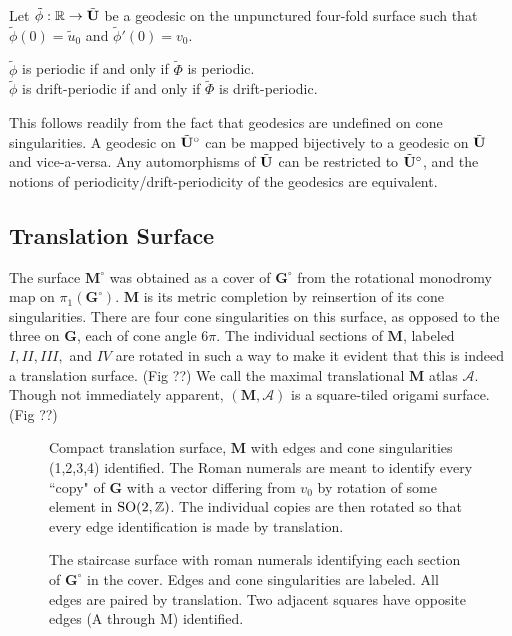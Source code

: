 \documentclass[a4paper, 11pt]{article}
\def\cA{\mathcal{A}}\def\cB{\mathcal{B}}\def\cC{\mathcal{C}}\def\cD{\mathcal{D}}\def\cE{\mathcal{E}}\def\cF{\mathcal{F}}\def\cG{\mathcal{G}}\def\cH{\mathcal{H}}\def\cI{\mathcal{I}}\def\cJ{\mathcal{J}}\def\cK{\mathcal{K}}\def\cL{\mathcal{L}}\def\cM{\mathcal{M}}\def\cN{\mathcal{N}}\def\cO{\mathcal{O}}\def\cP{\mathcal{P}}\def\cQ{\mathcal{Q}}\def\cR{\mathcal{R}}\def\cS{\mathcal{S}}\def\cT{\mathcal{T}}\def\cU{\mathcal{U}}\def\cV{\mathcal{V}}\def\cW{\mathcal{W}}\def\cX{\mathcal{X}}\def\cY{\mathcal{Y}}\def\cZ{\mathcal{Z}}
\def\bG{\mathbf{G}} \def\bGs{\mathbf{G}^\circ}
\def\bM{\mathbf{M}}
\def\bMs{\mathbf{M}^\circ}
\def\btUs{\btU^\circ}
\def\utild{\tilde{u}_0}
\def\phitild{\tilde{\Phi}}
\def\tildphi{\tilde{\phi}}
\def\SO{\mathrm{SO}}
\begin{document}
\begin{Def}
Let $\tildphi:\RR\rightarrow\btU$ be a geodesic on the unpunctured four-fold surface such that $\tildphi(0)=\utild$ and $\tildphi'(0)=v_0$.
\end{Def}

\begin{thm}
$\tildphi$ is periodic if and only if $\phitild$ is periodic.\\
$\tildphi$ is drift-periodic if and only if $\phitild$ is drift-periodic.
\end{thm}

This follows readily from the fact that geodesics are undefined on cone singularities. A geodesic on $\btUs$ can be mapped bijectively to a geodesic on  $\tilde{\mathbf{U}}$ and vice-a-versa. Any automorphisms of $\tilde{\mathbf{U}}$ can be restricted to $\btUs$, and the notions of periodicity/drift-periodicity of the geodesics are equivalent.



\subsection{Translation Surface}
The surface $\bMs$ was obtained as a cover of $\bGs$ from the rotational monodromy map on $\pi_1(\bGs)$. $\bM$ is its metric completion by reinsertion of its cone singularities. There are four cone singularities on this surface, as opposed to the three on $\bG$, each of cone angle $6\pi$. The individual sections of $\bM$, labeled $I,II,III,$ and $IV$ are rotated in such a way to make it evident that this is indeed a translation surface. (Fig ??) We call the maximal translational $\bM$ atlas $\cA$. Though not immediately apparent, $(\bM,\cA)$ is a square-tiled origami surface. (Fig ??)

\begin{figure}[H]
\centering

\caption{Compact translation surface, $\mathbf{M}$ with edges and cone singularities (1,2,3,4) identified. The Roman numerals are meant to identify every ``copy" of $\bG$ with a vector differing from $v_0$ by rotation of some element in $\SO(2,\ZZ)$. The individual copies are then rotated so that every edge identification is made by translation.}
\label{fig:mtilda}
\end{figure}

\begin{figure}[H]
\centering

\caption{The staircase surface with roman numerals identifying each section of $\bGs$ in the cover. Edges and cone singularities are labeled. All edges are paired by translation. Two adjacent squares have opposite edges (A through M) identified.}
\label{fig:staircase}
\end{figure}
\end{document}
